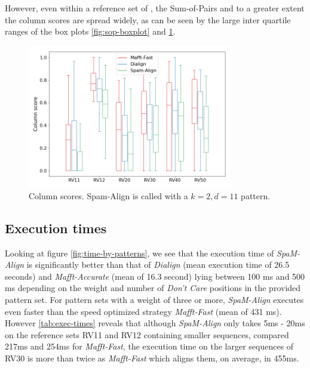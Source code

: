 However, even within a reference set of \bb, the Sum-of-Pairs and to a greater extent the column scores are spread widely, as can be seen by the large inter quartile ranges of the box plots \ref{fig:sop-boxplot} and \ref{fig:cs-boxplot}.

\begin{figure}[h]
	\centering
	\includegraphics[width=0.8\textwidth]{../alignment-evaluation/cs-boxplot.png}
	\caption{Column scores. Spam-Align is called with a $k = 2, d = 11$ pattern.}
	\label{fig:cs-boxplot}
\end{figure}

\subsection{Execution times}

Looking at figure \ref{fig:time-by-patterns}, we see that the execution time of \textit{SpaM-Align} is significantly better than that of \textit{Dialign} (mean execution time of 26.5 seconds) and \textit{Mafft-Accurate} (mean of 16.3 second) lying between 100 ms and 500 ms depending on the weight and number of \textit{Don't Care} positions in the provided pattern set. For pattern sets with a weight of three or more, \textit{SpaM-Align} executes even faster than the speed optimized strategy \textit{Mafft-Fast} (mean of 431 ms).\\
However \cref{tab:exec-times} reveals that although \textit{SpaM-Align} only takes 5ms - 20ms on the reference sets RV11 and RV12 containing smaller sequences, compared 217ms and 254ms for \textit{Mafft-Fast}, the execution time on the larger sequences of RV30 is more than twice as \textit{Mafft-Fast} which aligns them, on average, in 455ms.

